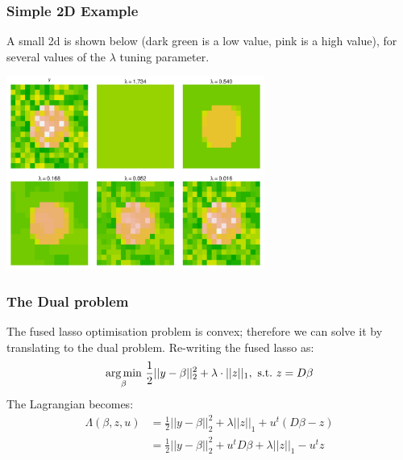 \begin{frame}
  \frametitle{Simple 2D Example}
  \small

  A small 2d is shown below (dark green is a low value, pink is a high value), for several
  values of the $\lambda$ tuning parameter.

  \vspace{-0in}

  \begin{center}
  \includegraphics[height=2.5in]{img/simple_2dfused}
  \end{center}

\end{frame}


\begin{frame}
  \frametitle{The Dual problem}
  \footnotesize

  The fused lasso optimisation problem is convex; therefore we can solve it by translating
  to the dual problem. Re-writing the fused lasso as:
  \begin{align}
  \mathop{\mathrm{arg\,min}}_{\beta} \, \frac{1}{2}|| y - \beta ||_2^2 +
           \lambda \cdot || z ||_1, \, \, \text{s.t.} \, \, z = D\beta
  \end{align}
  \pause The Lagrangian becomes:
  \begin{align}
  \Lambda(\beta, z, u) &= \frac{1}{2} || y - \beta ||_2^2 + \lambda ||z||_1 + u^{t} (D\beta - z) \\
  &= \frac{1}{2} || y - \beta ||_2^2 +u^{t} D\beta + \lambda ||z||_1 - u^{t} z
  \end{align}

\end{frame}

